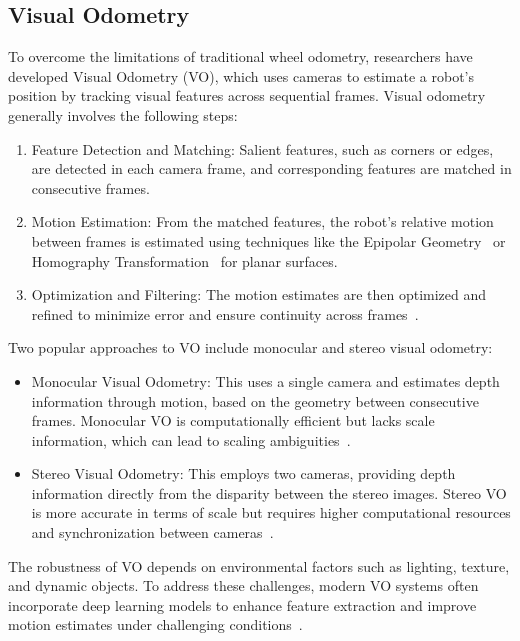 \subsection{Visual Odometry}

To overcome the limitations of traditional wheel odometry, researchers have developed Visual Odometry (VO), which uses cameras to estimate a robot’s position by tracking visual features across sequential frames. Visual odometry generally involves the following steps:

\begin{enumerate} 
    \item Feature Detection and Matching: Salient features, such as corners or edges, are detected in each camera frame, and corresponding features are matched in consecutive frames.
    \item Motion Estimation: From the matched features, the robot’s relative motion between frames is estimated using techniques like the Epipolar Geometry~\cite{epipolar_geometry} or Homography Transformation~\cite{homography_transformation} for planar surfaces.
    \item Optimization and Filtering: The motion estimates are then optimized and refined to minimize error and ensure continuity across frames~\cite{visual_odometry}.
\end{enumerate}

Two popular approaches to VO include monocular and stereo visual odometry:
\begin{itemize}
    \item Monocular Visual Odometry: This uses a single camera and estimates depth information through motion, based on the geometry between consecutive frames. Monocular VO is computationally efficient but lacks scale information, which can lead to scaling ambiguities~\cite{monocular_VO}.
    \item Stereo Visual Odometry: This employs two cameras, providing depth information directly from the disparity between the stereo images. Stereo VO is more accurate in terms of scale but requires higher computational resources and synchronization between cameras~\cite{stereo_VO}.
\end{itemize}

The robustness of VO depends on environmental factors such as lighting, texture, and dynamic objects. To address these challenges, modern VO systems often incorporate deep learning models to enhance feature extraction and improve motion estimates under challenging conditions~\cite{deepVO}.

